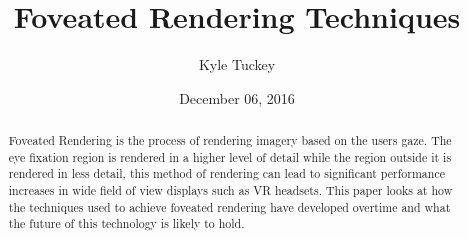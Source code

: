 \documentclass{llncs}
\begin{document}
\title{Foveated Rendering Techniques}
\author{Kyle Tuckey}
\date{December 06, 2016}
\maketitle
\begin{abstract}
Foveated Rendering is the process of rendering imagery based on the users gaze. The eye fixation region is rendered in a higher level of detail while the region outside it is rendered in less detail, this method of rendering can lead to significant performance increases in wide field of view displays such as VR headsets. This paper looks at how the techniques used to achieve foveated rendering have developed overtime and what the future of this technology is likely to hold.
\end{abstract}







\end{document}
